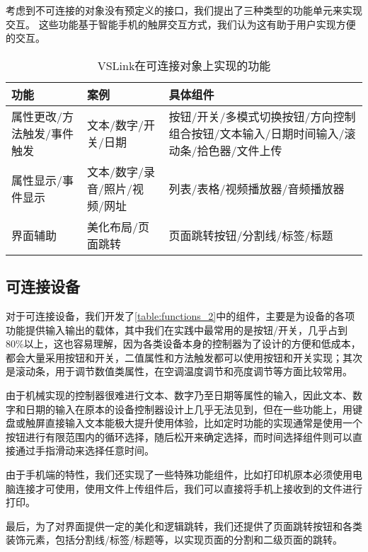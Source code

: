 考虑到不可连接的对象没有预定义的接口，我们提出了三种类型的功能单元来实现交互。
这些功能基于智能手机的触屏交互方式，我们认为这有助于用户实现方便的交互。

\vspace{-1em}
\begin{table}[htbp]
	\caption{VSLink在可连接对象上实现的功能}  \label{table:functions_2} 
	\begin{center}  
		\begin{tabular}{|m{2.2cm}<{\centering}|m{6cm}<{\centering}|m{6cm}<{\centering}|}  
			\hline  
			\textbf{功能} & \textbf{案例} &\textbf{具体组件}\\ \hline  
			属性更改/方法触发/事件触发 & 文本/数字/开关/日期 & 按钮/开关/多模式切换按钮/方向控制组合按钮/文本输入/日期时间输入/滚动条/拾色器/文件上传 \\ \hline 
			属性显示/事件显示 & 文本/数字/录音/照片/视频/网址 & 列表/表格/视频播放器/音频播放器  \\ \hline
			界面辅助 & 美化布局/页面跳转 & 页面跳转按钮/分割线/标签/标题 \\ \hline
		\end{tabular}  
	\end{center}  
\end{table}

\subsection{可连接设备}
对于可连接设备，我们开发了\autoref{table:functions_2}中的组件，主要是为设备的各项功能提供输入输出的载体，其中我们在实践中最常用的是按钮/开关，几乎占到80\%以上，这也容易理解，因为各类设备本身的控制器为了设计的方便和低成本，都会大量采用按钮和开关，二值属性和方法触发都可以使用按钮和开关实现；其次是滚动条，用于调节数值类属性，在空调温度调节和亮度调节等方面比较常用。

由于机械实现的控制器很难进行文本、数字乃至日期等属性的输入，因此文本、数字和日期的输入在原本的设备控制器设计上几乎无法见到，但在一些功能上，用键盘或触屏直接输入文本能极大提升使用体验，比如定时功能的实现通常是使用一个按钮进行有限范围内的循环选择，随后松开来确定选择，而时间选择组件则可以直接通过手指滑动来选择任意时间。

由于手机端的特性，我们还实现了一些特殊功能组件，比如打印机原本必须使用电脑连接才可使用，使用文件上传组件后，我们可以直接将手机上接收到的文件进行打印。

最后，为了对界面提供一定的美化和逻辑跳转，我们还提供了页面跳转按钮和各类装饰元素，包括分割线/标签/标题等，以实现页面的分割和二级页面的跳转。


